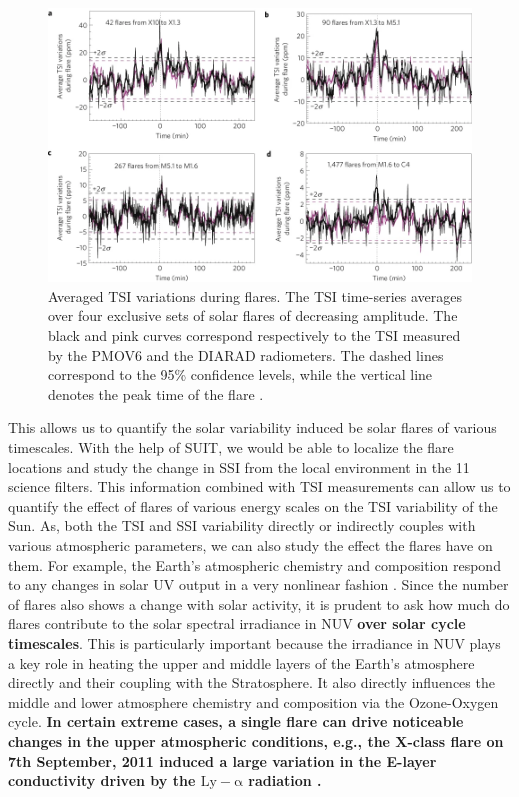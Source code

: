 \begin{figure}[ht!]
    \centering
    \includegraphics[width = 0.7\linewidth]{Figures/nphys1741_page-0002.png}
    \caption[Averaged TSI variations during flares of various strengths.]{Averaged TSI variations during flares. The TSI time-series averages over four exclusive sets of solar flares of decreasing amplitude. The black and pink curves correspond respectively to the TSI measured by the PMOV6 and the DIARAD radiometers. The dashed lines correspond to the 95\% confidence levels, while the vertical line denotes the peak time of the flare \citep{kretzschmar10}.}
    \label{fig2}
\end{figure}

This allows us to quantify the solar variability induced be solar flares of various timescales. With the help of SUIT, we would be able to localize the flare locations and study the change in SSI from the local environment in the 11 science filters. This information combined with TSI measurements can allow us to quantify the effect of flares of various energy scales on the TSI variability of the Sun. As, both the TSI and SSI variability directly or indirectly couples with various atmospheric parameters, we can also study the effect the flares have on them. For example, the Earth's atmospheric chemistry and composition respond to any changes in solar UV output in a very nonlinear fashion \citep{haigh07}. Since the number of flares also shows a change with solar activity, it is prudent to ask how much do flares contribute to the solar spectral irradiance in NUV {\bf over solar cycle timescales}. This is particularly important because the irradiance in NUV plays a key role in heating the upper and middle layers of the Earth's atmosphere directly and their coupling with the Stratosphere. It also directly influences the middle and lower atmosphere chemistry and composition via the Ozone-Oxygen cycle. {\bf In certain extreme cases, a single flare can drive noticeable changes in the upper atmospheric conditions, e.g., the X-class flare on 7th September, 2011 induced a large variation in the E-layer conductivity driven by the $\mathrm{Ly-\alpha}$ radiation \citep[see Fig.10 and the accompanying discussion in][]{milligan20}.}


